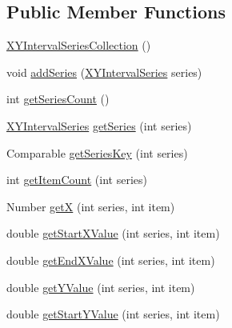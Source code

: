 \subsection*{Public Member Functions}
\begin{DoxyCompactItemize}
\item 
\mbox{\hyperlink{classorg_1_1jfree_1_1data_1_1xy_1_1_x_y_interval_series_collection_aec1683cc7c020c676d88b95c80738922}{X\+Y\+Interval\+Series\+Collection}} ()
\item 
void \mbox{\hyperlink{classorg_1_1jfree_1_1data_1_1xy_1_1_x_y_interval_series_collection_a2ac5e3448ee3a2e8a8a40685496b1803}{add\+Series}} (\mbox{\hyperlink{classorg_1_1jfree_1_1data_1_1xy_1_1_x_y_interval_series}{X\+Y\+Interval\+Series}} series)
\item 
int \mbox{\hyperlink{classorg_1_1jfree_1_1data_1_1xy_1_1_x_y_interval_series_collection_aae35bb3146172522ddd725598891b555}{get\+Series\+Count}} ()
\item 
\mbox{\hyperlink{classorg_1_1jfree_1_1data_1_1xy_1_1_x_y_interval_series}{X\+Y\+Interval\+Series}} \mbox{\hyperlink{classorg_1_1jfree_1_1data_1_1xy_1_1_x_y_interval_series_collection_af253956a1bbd6db01a8429adc3268725}{get\+Series}} (int series)
\item 
Comparable \mbox{\hyperlink{classorg_1_1jfree_1_1data_1_1xy_1_1_x_y_interval_series_collection_a4d91349fc5532ee839dad049afe5126c}{get\+Series\+Key}} (int series)
\item 
int \mbox{\hyperlink{classorg_1_1jfree_1_1data_1_1xy_1_1_x_y_interval_series_collection_a5cc746cbd6f7de1b6593782a3c5b6739}{get\+Item\+Count}} (int series)
\item 
Number \mbox{\hyperlink{classorg_1_1jfree_1_1data_1_1xy_1_1_x_y_interval_series_collection_a0abae4cd2bcaab48244751b896c0ee5d}{getX}} (int series, int item)
\item 
double \mbox{\hyperlink{classorg_1_1jfree_1_1data_1_1xy_1_1_x_y_interval_series_collection_a10718ae7eb5370e473b0c9f1c0e23d58}{get\+Start\+X\+Value}} (int series, int item)
\item 
double \mbox{\hyperlink{classorg_1_1jfree_1_1data_1_1xy_1_1_x_y_interval_series_collection_ae3675851fa4f1058f12edc92fd6fa997}{get\+End\+X\+Value}} (int series, int item)
\item 
double \mbox{\hyperlink{classorg_1_1jfree_1_1data_1_1xy_1_1_x_y_interval_series_collection_a2dbffee80faab6bf16da287aecd32685}{get\+Y\+Value}} (int series, int item)
\item 
double \mbox{\hyperlink{classorg_1_1jfree_1_1data_1_1xy_1_1_x_y_interval_series_collection_ac95d13ee5b7dd702f9a9fdf7f78a79e9}{get\+Start\+Y\+Value}} (int series, int item)

\end{DoxyCompactItemize}
